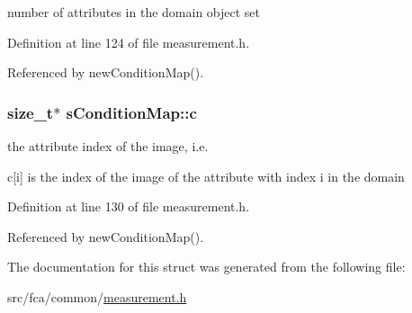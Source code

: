 number of attributes in the domain object set 



\-Definition at line 124 of file measurement.\-h.



\-Referenced by new\-Condition\-Map().

\hypertarget{structsConditionMap_a8fba8e129aa41cc4fd2f1898e83c2f28}{
\subsubsection[{c}]{\setlength{\rightskip}{0pt plus 5cm}size\-\_\-t$\ast$ {\bf s\-Condition\-Map\-::c}}}\label{structsConditionMap_a8fba8e129aa41cc4fd2f1898e83c2f28}


the attribute index of the image, i.\-e. 

c\mbox{[}i\mbox{]} is the index of the image of the attribute with index i in the domain 

\-Definition at line 130 of file measurement.\-h.



\-Referenced by new\-Condition\-Map().



\-The documentation for this struct was generated from the following file\-:\begin{DoxyCompactItemize}
\item 
src/fca/common/\hyperlink{common_2measurement_8h}{measurement.\-h}\end{DoxyCompactItemize}
